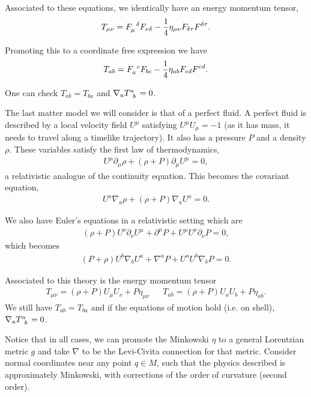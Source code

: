 Associated to these equations, we identically have an energy momentum tensor,
\begin{align}
    T_{\mu \nu} = \tensor{F}{_{\mu}^{\delta}} F_{\nu \delta} -\frac{1}{4} \eta_{\mu \nu} F_{\delta \tau} F^{\delta \tau}
.\end{align}

Promoting this to a coordinate free expression we have
\begin{align}
    T_{ab} = \tensor{F}{_{a}^{c}} F_{bc} -\frac{1}{4} \eta_{ab} F_{cd} F^{cd}
.\end{align}

One can check $T_{ab} = T_{ba}$ and $\nabla_a \tensor{T}{^{a}_b} = 0$.

The last matter model we will consider is that of a perfect fluid. A perfect fluid is described by a local velocity field $U^{\mu}$ satisfying $U^{\mu} U_{\mu} = -1$ (as it has mass, it needs to travel along a timelike trajectory). It also has a pressure $P$ and a density $\rho$. These variables satisfy the first law of thermodynamics,
\begin{align}
    U^{\mu} \partial_\mu \rho + \left( \rho + P \right) \partial_\mu U^{\mu} = 0
,\end{align}
a relativistic analogue of the continuity equation. This becomes the covariant equation,
\begin{align}
    U^{a} \nabla_a \rho + \left( \rho + P \right) \nabla_a U^{a} = 0
.\end{align}

We also have Euler's equations in a relativistic setting which are
\begin{align}
    \left( \rho + P \right) U^{\nu} \partial_\nu U^{\mu} + \partial^{\mu} P + U^{\mu} U^{\nu} \partial_\nu P = 0
,\end{align}
which becomes
\begin{align}
    \left( P + \rho \right)  U^{b} \nabla_b U^{a} + \nabla^{a} P + U^{a} U^{b} \nabla_b P = 0
.\end{align}

Associated to this theory is the energy momentum tensor
\begin{align}
    T_{\mu \nu} = \left( \rho + P \right) U_\mu U_\nu + P \eta_{\mu \nu} && T_{ab} = \left( \rho + P \right) U_a U_b + P \eta_{ab}
.\end{align}
We still have $T_{ab} = T_{ba}$ and if the equations of motion hold (i.e. on shell), $\nabla_a \tensor{T}{^{a}_b} = 0$.

Notice that in all cases, we can promote the Minkowski $\eta$ to a general Lorentzian metric $g$ and take $\nabla$ to be the Levi-Civita connection for that metric. Consider normal coordinates near any point $q \in M$, such that the physics described is approximately Minkowski, with corrections of the order of curvature (second order).

